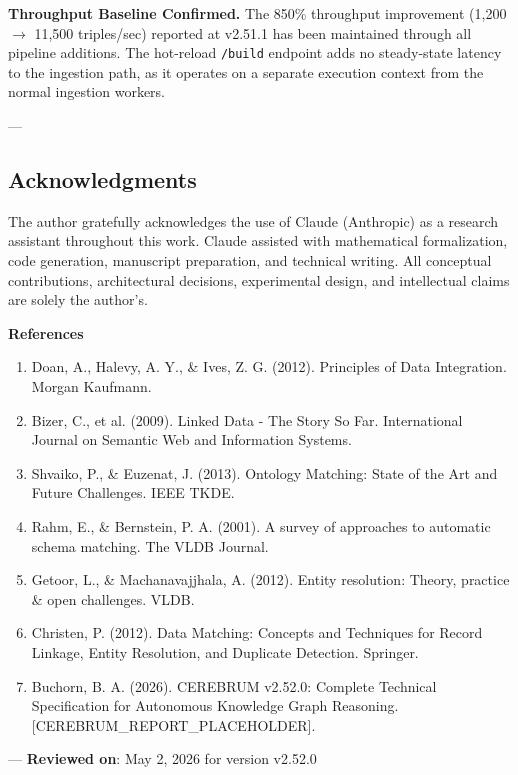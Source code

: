 \textbf{Throughput Baseline Confirmed.} The 850\% throughput improvement (1,200 $\to$ 11,500 triples/sec) reported at v2.51.1 has been maintained through all pipeline additions. The hot-reload \texttt{/build} endpoint adds no steady-state latency to the ingestion path, as it operates on a separate execution context from the normal ingestion workers.

---
\subsection{Acknow\-ledgments}

The author gratefully ackno\-wledges the use of Claude (Anthropic) as a research assistant throughout this work. Claude assisted with mathe\-matical forma\-lization, code generation, manuscript preparation, and technical writing. All conceptual contr\-ibutions, archi\-tectural decisions, exper\-imental design, and intel\-lectual claims are solely the author's.

\textbf{References}
\begin{enumerate}
\item Doan, A., Halevy, A. Y., \& Ives, Z. G. (2012). Principles of Data Integration. Morgan Kaufmann.
\item Bizer, C., et al. (2009). Linked Data - The Story So Far. Intern\-ational Journal on Semantic Web and Information Systems.
\item Shvaiko, P., \& Euzenat, J. (2013). Ontology Matching: State of the Art and Future Challenges. IEEE TKDE.
\item Rahm, E., \& Bernstein, P. A. (2001). A survey of approaches to automatic schema matching. The VLDB Journal.
\item Getoor, L., \& Machan\-avajjhala, A. (2012). Entity resolution: Theory, practice \& open challenges. VLDB.
\item Christen, P. (2012). Data Matching: Concepts and Techniques for Record Linkage, Entity Resolution, and Duplicate Detection. Springer.
\item Buchorn, B. A. (2026). CEREBRUM v2.52.0: Complete Technical Specif\-ication for Autonomous Knowledge Graph Reasoning. [CEREBRUM\_REPORT\_PLACEHOLDER].

\end{enumerate}
---
\textbf{Reviewed on}: May 2, 2026 for version v2.52.0
